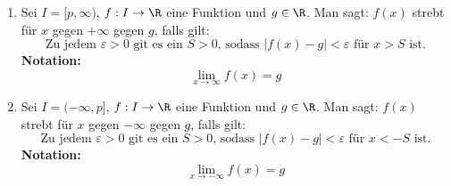 \begin{enumerate}[leftmargin=*]
    \item Sei $I = [p, \infty)$, $f: I \to \R$ eine Funktion und $g \in \R$. Man sagt: $f(x)$ strebt für $x$ gegen $+\infty$ gegen $g$, falls gilt:
    $$\text{Zu jedem $\varepsilon > 0$ git es ein $S > 0$, sodass $|f(x)-g| < \varepsilon$ für $x > S$ ist.}$$
    \textbf{Notation:} $$\lim_{x \to \infty} f(x) = g$$
    \item Sei $I = (-\infty, p]$, $f: I \to \R$ eine Funktion und $g \in \R$. Man sagt: $f(x)$ strebt für $x$ gegen $-\infty$ gegen $g$, falls gilt:
    $$\text{Zu jedem $\varepsilon > 0$ git es ein $S > 0$, sodass $|f(x)-g| < \varepsilon$ für $x < -S$ ist.}$$
    \textbf{Notation:} $$\lim_{x \to -\infty} f(x) = g$$
\end{enumerate}